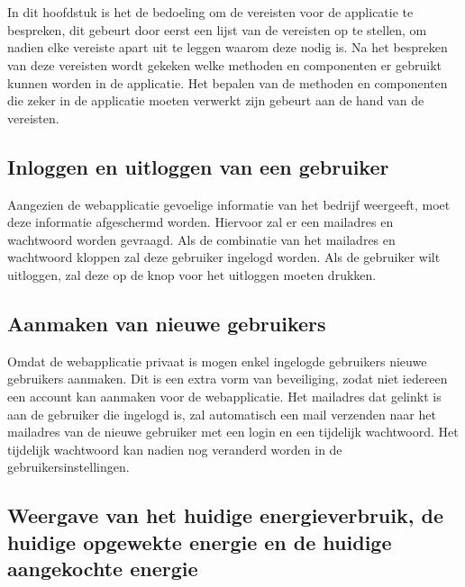 \chapter{}%
\label{ch:analyse-van-de-vereisten}

In dit hoofdstuk is het de bedoeling om de vereisten voor de applicatie te bespreken, dit gebeurt door eerst een lijst van de vereisten op te stellen, om nadien elke vereiste apart uit te leggen waarom deze nodig is. Na het bespreken van deze vereisten wordt gekeken welke methoden en componenten er gebruikt kunnen worden in de applicatie. Het bepalen van de methoden en componenten die zeker in de applicatie moeten verwerkt zijn gebeurt aan de hand van de vereisten.

\section{Inloggen en uitloggen van een gebruiker}
\label{sec:inloggen-en-uitloggen-van-een-gebruiker}

Aangezien de webapplicatie gevoelige informatie van het bedrijf weergeeft, moet deze informatie afgeschermd worden. Hiervoor zal er een mailadres en wachtwoord worden gevraagd. Als de combinatie van het mailadres en wachtwoord kloppen zal deze gebruiker ingelogd worden. Als de gebruiker wilt uitloggen, zal deze op de knop voor het uitloggen moeten drukken.

\section{Aanmaken van nieuwe gebruikers}
\label{sec:aanmaken-van-nieuwe-gebruikers}

Omdat de webapplicatie privaat is mogen enkel ingelogde gebruikers nieuwe gebruikers aanmaken. Dit is een extra vorm van beveiliging, zodat niet iedereen een account kan aanmaken voor de webapplicatie. Het mailadres dat gelinkt is aan de gebruiker die ingelogd is, zal automatisch een mail verzenden naar het mailadres van de nieuwe gebruiker met een login en een tijdelijk wachtwoord. Het tijdelijk wachtwoord kan nadien nog veranderd worden in de gebruikersinstellingen.

\section{Weergave van het huidige energieverbruik, de huidige opgewekte energie en de huidige aangekochte energie}
\label{sec:weergave-van-het-energieverbruik}

